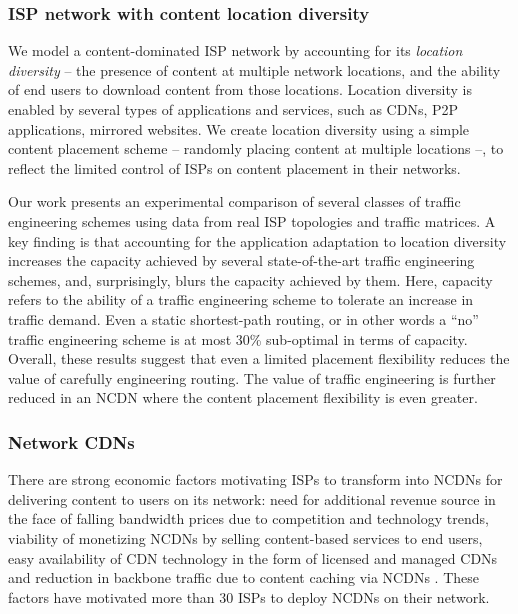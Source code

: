 \subsubsection{ISP network with content location diversity}

We model a content-dominated ISP network by accounting for its \emph{location diversity} -- the presence of content at multiple network locations, and the ability of end users to download content from those locations. Location diversity is enabled by several types of applications and services, such as CDNs, P2P applications, mirrored websites. We create location diversity using a simple content placement scheme -- randomly placing content at multiple locations --, to reflect the limited control of ISPs on content placement in their networks. 


Our work presents an experimental comparison of several classes of traffic engineering schemes using data from real ISP topologies and traffic matrices. A key finding is that accounting for the application adaptation to location diversity increases the capacity achieved by several state-of-the-art traffic engineering schemes, and, surprisingly, blurs the capacity achieved by them. Here, capacity refers to the ability of a traffic engineering scheme to tolerate an increase in traffic demand. Even a static shortest-path routing, or in other words a ``no'' traffic engineering  scheme is at most 30\% sub-optimal in terms of capacity. Overall, these results suggest that even a limited placement flexibility reduces the value of carefully engineering routing. The value of traffic engineering is further reduced in an NCDN where the content placement flexibility is even greater.

\subsubsection{Network CDNs}

There are strong economic factors motivating ISPs to transform into NCDNs for delivering content to users on its network: need for additional revenue source in the face of falling bandwidth prices due to competition and technology trends, viability of monetizing NCDNs by selling content-based services to end users, easy availability of CDN technology in the form of licensed and managed CDNs and reduction in backbone traffic due to content caching via NCDNs \cite{telco-cdn-arguments}. These factors have motivated more than 30 ISPs to deploy NCDNs on their network.

